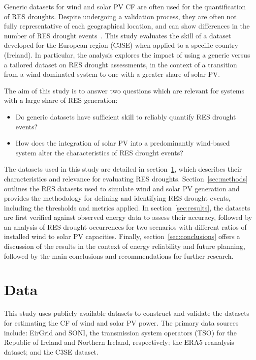 \documentclass[preprint, 12pt]{elsarticle}
\begin{document}
Generic datasets for wind and solar PV CF are often used for the quantification of RES droughts. Despite undergoing a validation process, they are often not fully representative of each geographical location, and can show differences in the number of RES drought events~\citep{kies2021drought}. This study evaluates the skill of a dataset developed for the European region (C3SE) when applied to a specific country (Ireland). In particular, the analysis explores the impact of using a generic versus a tailored dataset on RES drought assessments, in the context of a transition from a wind-dominated system to one with a greater share of solar PV.

The aim of this study is to answer two questions which are relevant for systems with a large share of RES generation:
\begin{itemize}
	\item Do generic datasets have sufficient skill to reliably quantify RES drought events?
	\item How does the integration of solar PV into a predominantly wind-based system alter the characteristics of RES drought events?
\end{itemize}

The datasets used in this study are detailed in section~\ref{sec:data}, which describes their characteristics and relevance for evaluating RES droughts. Section~\ref{sec:methods} outlines the RES datasets used to simulate wind and solar PV generation and provides the methodology for defining and identifying RES drought events, including the thresholds and metrics applied. In section~\ref{sec:results}, the datasets are first verified against observed energy data to assess their accuracy, followed by an analysis of RES drought occurrences for two scenarios with different ratios of installed wind to solar PV capacities. Finally, section~\ref{sec:conclusions} offers a discussion of the results in the context of energy reliability and future planning, followed by the main conclusions and recommendations for further research.

\section{Data}
\label{sec:data}

This study uses publicly available datasets to construct and validate the datasets for estimating the CF of wind and solar PV power. The primary data sources include: EirGrid and SONI, the transmission system operators (TSO) for the Republic of Ireland and Northern Ireland, respectively; the ERA5 reanalysis dataset; and the C3SE dataset.
\end{document}
